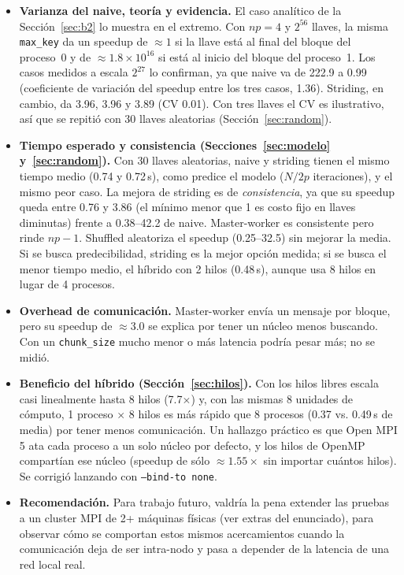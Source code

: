 \documentclass[11pt,letterpaper]{article}
\begin{document}
\begin{itemize}
    \item \textbf{Varianza del naive, teoría y evidencia.} El caso
    analítico de la Sección~\ref{sec:b2} lo muestra en el extremo. Con
    $np=4$ y $2^{56}$ llaves, la misma \texttt{max\_key} da un speedup de
    $\approx1$ si la llave está al final del bloque del proceso~0 y de
    $\approx1.8\times10^{16}$ si está al inicio del bloque del
    proceso~1. Los casos medidos a escala $2^{27}$ lo confirman, ya que naive
    va de 222.9 a 0.99 (coeficiente de variación del speedup entre los
    tres casos, 1.36). Striding, en cambio, da 3.96, 3.96 y 3.89
    (CV 0.01). Con tres llaves el CV es ilustrativo, así que se
    repitió con 30 llaves aleatorias (Sección~\ref{sec:random}).
    \item \textbf{Tiempo esperado y consistencia (Secciones~\ref{sec:modelo} y~\ref{sec:random}).}
    Con 30 llaves aleatorias, naive y striding tienen el mismo tiempo medio
    (0.74 y 0.72\,s), como predice el modelo ($N/2p$ iteraciones), y el
    mismo peor caso. La mejora de striding es de \textit{consistencia}, ya que su speedup
    queda entre 0.76 y 3.86 (el mínimo menor que 1 es costo fijo en llaves
    diminutas) frente a 0.38--42.2 de naive. Master-worker es consistente
    pero rinde $np-1$. Shuffled aleatoriza el speedup (0.25--32.5) sin
    mejorar la media. Si se busca predecibilidad, striding es la mejor
    opción medida; si se busca el menor tiempo medio, el híbrido con 2 hilos
    (0.48\,s), aunque usa 8 hilos en lugar de 4 procesos.
    \item \textbf{Overhead de comunicación.} Master-worker envía un
    mensaje por bloque, pero su speedup de $\approx3.0$ se explica por
    tener un núcleo menos buscando. Con un \texttt{chunk\_size} mucho
    menor o más latencia podría pesar más; no se midió.
    \item \textbf{Beneficio del híbrido (Sección~\ref{sec:hilos}).} Con los hilos libres
    escala casi linealmente hasta 8 hilos (7.7$\times$) y, con las mismas 8 unidades de
    cómputo, 1 proceso $\times$ 8 hilos es más rápido que 8 procesos (0.37 vs. 0.49\,s de media)
    por tener menos comunicación. Un hallazgo práctico es que Open MPI 5 ata cada
    proceso a un solo núcleo por defecto, y los hilos de OpenMP compartían ese
    núcleo (speedup de sólo $\approx1.55\times$ sin importar cuántos hilos). Se
    corrigió lanzando con \texttt{--bind-to none}.
    \item \textbf{Recomendación.} Para trabajo futuro, valdría la pena
    extender las pruebas a un cluster MPI de 2+ máquinas físicas (ver
    extras del enunciado), para observar cómo se comportan estos
    mismos acercamientos cuando la comunicación deja de ser intra-nodo
    y pasa a depender de la latencia de una red local real.
\end{itemize}
\end{document}
